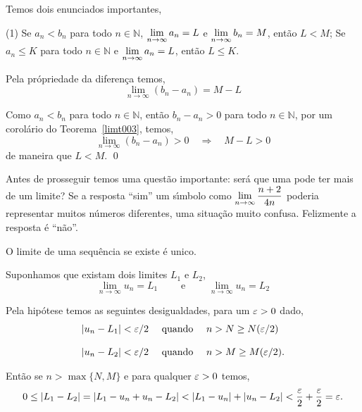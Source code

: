\begin{coro} Temos dois enunciados importantes,
\begin{tasks}[label=\rm{(\alph*)},item-indent=3.5em,label-width=4ex,ref=(\alph*)](1)
\task Se $a_n<b_n$ para todo $n\in \mathbb{N}$, $\displaystyle{\lim_{n\to \infty} a_n=L}$ e 
$\displaystyle{\lim_{n\to \infty} b_n=M}$, ent\~{a}o $L<M$; 
\task Se $a_n\leq K$ para todo $n\in \mathbb{N}$ e $\displaystyle{\lim_{n\to \infty} a_n=L}$, ent\~{a}o $L\leq K$.   
\end{tasks}
\end{coro}

\prova Pela pr\'{o}priedade da diferen\c{c}a temos,
\begin{equation*}
  \lim_{n\to \infty}(b_n- a_n)=M-L
\end{equation*}

Como $a_n<b_n$ para todo $n\in \mathbb{N}$, ent\~{a}o $b_n-a_n>0$ para todo $n\in \mathbb{N}$, por um corol\'{a}rio do Teorema~\ref{limt003}, temos,
\begin{equation*}
 \lim_{n\to \infty}(b_n- a_n)>0\quad \Rightarrow\quad M-L>0
\end{equation*}
de maneira que $L<M$. \qed


Antes de prosseguir temos uma quest\~{a}o importante: ser\'{a} que uma \seq
pode ter mais de um limite? Se a resposta ``sim''  um s\'{\i}mbolo como
$\displaystyle{\lim_{n\to\infty}\frac{n+2}{4n}}$ poderia representar muitos
n\'{u}meros diferentes, uma situa\c{c}\~{a}o muito confusa. Felizmente a
resposta \'{e} ``n\~{a}o''.

\begin{fteo}[Unicidade]
O limite de uma sequ\^{e}ncia se existe \'{e} unico.
\end{fteo}

\prova Suponhamos que existam dois limites $L_1$ e $L_2$,
\begin{equation*}
  \lim_{n\to\infty}u_n =L_1\qquad\text{ e }\qquad \lim_{n\to\infty}u_n=L_2
\end{equation*}

Pela hip\'{o}tese temos as seguintes desigualdades, para um $\varepsilon>0$ dado,
\begin{align*}
  |u_n-L_1|<\varepsilon/2 &\quad \text{ quando }\quad n>N\geq N(\varepsilon/2) \\[2ex]
  |u_n-L_2|<\varepsilon/2 &\quad \text{ quando }\quad n>M\geq M(\varepsilon/2).
\end{align*}

Ent\~{a}o se $n>\max\{N, M\}$ e para qualquer $\varepsilon>0$ temos,
\begin{equation*}
  0\leq|L_1-L_2|=|L_1-u_n+u_n-L_2|<|L_1-u_n|+|u_n-L_2|<\frac{\vep}{2}+\frac{\vep}{2}=\vep.
\end{equation*}

